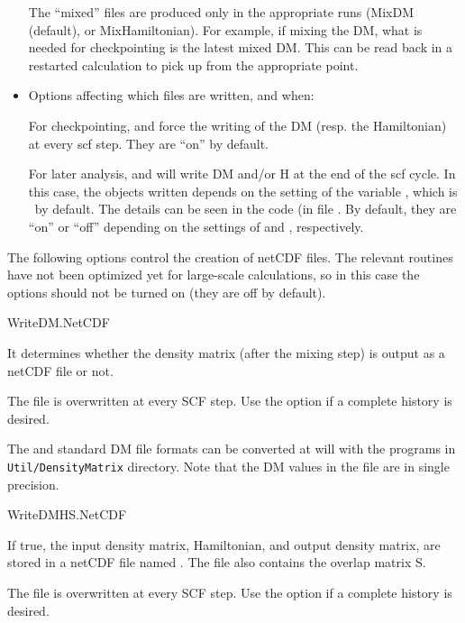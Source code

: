 \begin{itemize}
\begin{verbatim}
\end{verbatim}  
  
The ``mixed'' files are produced only in the appropriate runs (MixDM
(default), or MixHamiltonian). For example, if mixing the DM, what is
needed for checkpointing is the latest mixed DM. This can be read back
in a restarted calculation to pick up from the appropriate point.
  
\item Options affecting which files are written, and when:
  
For checkpointing,   and   force the writing
of the DM (resp. the Hamiltonian) at every scf step. They are ``on''
by default.
  
For later analysis,  and
 will write DM and/or H at the end of the scf
cycle. In this case, the objects written depends on the setting of the
variable , which is \fdffalse\ by
default. The details can be seen in the
code (in file . By default, they are ``on'' or
``off'' depending on the settings of   and  ,
respectively.

\end{itemize}

The following options control the creation of netCDF files. The
relevant routines have not been optimized yet for large-scale
calculations, so in this case the options should not be turned on
(they are off by default).


\begin{fdflogicalT}{WriteDM.NetCDF}
  
  It determines whether the density matrix (after the mixing step) is
  output as a  netCDF file or not.

  The file is overwritten at every SCF step. Use the
   option if a complete history is
  desired.

  The  and standard DM file formats can be converted at
  will with the programs in \texttt{Util/DensityMatrix}
  directory. Note that the DM values in the  file are in
  single precision.

\end{fdflogicalT}

\begin{fdflogicalT}{WriteDMHS.NetCDF}

  
  If true, the input density matrix, Hamiltonian, and output density
  matrix, are stored in a netCDF file named . The file
  also contains the overlap matrix S.

  The file is overwritten at every SCF step. Use the
   option if a complete history is
  desired.

\end{fdflogicalT}


